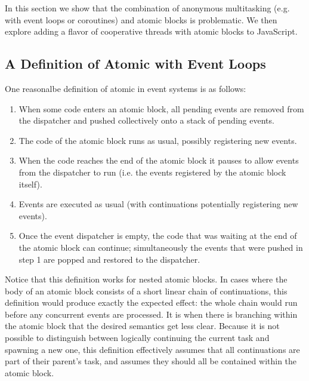 \documentclass[acmsmall,anonymous,review]{acmart}\settopmatter{printfolios=true,printccs=false,printacmref=false}
\begin{document}

In this section we show that the combination of anonymous multitasking (e.g. with event loops or coroutines) and atomic blocks is problematic.
We then explore adding a flavor of cooperative threads with atomic blocks to JavaScript.

\subsection{A Definition of Atomic with Event Loops} \label{sec:candidate_atomic}

One reasonalbe definition of atomic in event systems is as follows:


\begin{enumerate}
\item When some code enters an atomic block, all pending events are removed from the dispatcher and pushed collectively onto a stack of pending events.
\item The code of the atomic block runs as usual, possibly registering new events.
\item When the code reaches the end of the atomic block it pauses to allow events from the dispatcher to run (i.e. the events registered by the atomic block itself).
\item Events are executed as usual (with continuations potentially registering new events).
\item Once the event dispatcher is empty, the code that was waiting at the end of the atomic block can continue; simultaneously the events that were pushed in step 1 are popped and restored to the dispatcher.
\end{enumerate}

Notice that this definition works for nested atomic blocks.
In cases where the body of an atomic block consists of a short linear chain of continuations, this definition would produce exactly the expected effect: the whole chain would run before any concurrent events are processed.
It is when there is branching within the atomic block that the desired semantics get less clear.
Because it is not possible to distinguish between logically continuing the current task and spawning a new one, this definition effectively assumes that all continuations are part of their parent's task, and assumes they should all be contained within the atomic block.
\end{document}
